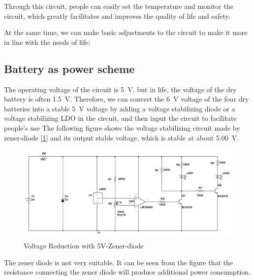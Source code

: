 \documentclass[12pt]{article}
\numberwithin{equation}{section}
\begin{document}
Through this circuit, people can easily set the temperature and monitor the circuit, which greatly facilitates and improves the quality of life and safety.


At the same time, we can make basic adjustments to the circuit to make it more in line with the needs of life:


\subsection{Battery as power scheme}
The operating voltage of the circuit is \qty{5}{V}, but in life, the voltage of the dry battery is often \qty{1.5}{V}. Therefore, we can convert the \qty{6}{V} voltage of the four dry batteries into a stable \qty{5}{V} voltage by adding a voltage stabilizing diode or a voltage stabilizing LDO in the circuit, and then input the circuit to facilitate people's use The following figure shows the voltage stabilizing circuit made by zener-diode [\ref{Fig.zener}] and its output stable voltage, which is stable at about \qty{5.00}{V}.


\begin{figure}[H] %
\centering %
\includegraphics[width=1\textwidth]{zener} %
\caption{Voltage Reduction with 5V-Zener-diode} %
\label{Fig.zener} %
\end{figure}



The zener diode is not very suitable. It can be seen from the figure that the resistance connecting the zener diode will produce additional power consumption. %
\end{document}

